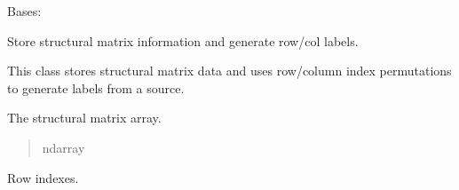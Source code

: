 \documentclass[letterpaper,12pt,english]{sphinxmanual}
\begin{document}
\begin{fulllineitems}
\label{\detokenize{api/core:cbmpy.CBCommon.StructMatrix}}
\pysigstartsignatures
\pysiglinewithargsret
{}
{\sphinxparamcomma {}\sphinxparamcomma {}\sphinxparamcomma {}\sphinxparamcomma {}}
{}
\pysigstopsignatures
\sphinxAtStartPar
Bases: 

\sphinxAtStartPar
Store structural matrix information and generate row/col labels.

\sphinxAtStartPar
This class stores structural matrix data and uses row/column index permutations
to generate labels from a source.

\begin{fulllineitems}
\label{\detokenize{api/core:cbmpy.CBCommon.StructMatrix.array}}
\pysigstartsignatures
\pysigline
{}
\pysigstopsignatures
\sphinxAtStartPar
The structural matrix array.
\begin{quote}\begin{description}
\sphinxAtStartPar
ndarray

\end{description}\end{quote}

\end{fulllineitems}


\begin{fulllineitems}
\label{\detokenize{api/core:cbmpy.CBCommon.StructMatrix.ridx}}
\pysigstartsignatures
\pysigline
{}
\pysigstopsignatures
\sphinxAtStartPar
Row indexes.
\begin{quote}\begin{description}
\sphinxAtStartPar
{}


\end{description}
\end{quote}
\end{fulllineitems}
\end{fulllineitems}
\end{document}
